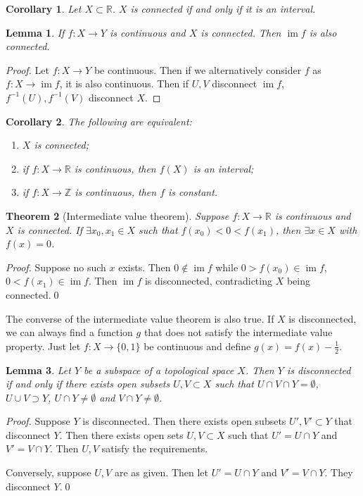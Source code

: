 \documentclass{article}
\theoremstyle{plain}\theoremheaderfont{\normalfont\itshape}\theorembodyfont{\rmfamily}\theoremseparator{.}\newtheorem*{rem}{Remark}\newtheorem*{ex}{Example}\newtheorem*{proof}{Proof}\newtheorem*{altp}{Alternative proof}
\theoremstyle{plain}\theoremheaderfont{\normalfont\bfseries}\theorembodyfont{\rmfamily}\theoremseparator{.}\newtheorem{thm}{Theorem}[section]\newtheorem{lem}[thm]{Lemma}\newtheorem{prop}[thm]{Proposition}\newtheorem*{cor}{Corollary}\newtheorem{defn}[thm]{Definition}\newtheorem{clm}[thm]{Claim}\newtheorem{clminproof}{Claim}
\theoremstyle{break}\theoremheaderfont{\normalfont\itshape}\theorembodyfont{\rmfamily}\theoremseparator{.\medskip}\newtheorem*{proofskip}{Proof}\newtheorem*{exs}{Examples}\newtheorem*{rems}{Remarks}
\theoremstyle{break}\theoremheaderfont{\normalfont\bfseries}\theorembodyfont{\rmfamily}\theoremseparator{.\medskip}\newtheorem{lemskip}[thm]{Lemma}\newtheorem{defnskip}[thm]{Definition}\newtheorem{propskip}[thm]{Proposition}\newtheorem{thmskip}[thm]{Theorem}
\newcommand{\qed}{\hfill\ensuremath{\Box}}
\DeclareMathOperator{\im}{im}
\begin{document}
    \begin{cor}
        Let \(X\subset\mathbb{R}\). \(X\) is connected if and only if it is an interval.
    \end{cor}

    \begin{lem}
        If \(f:X\to Y\) is continuous and \(X\) is connected. Then \(\im f\) is also connected.
    \end{lem}
    \begin{proof}
        Let \(f:X\to Y\) be continuous. Then if we alternatively consider \(f\) as \(f:X\to \im f\), it is also continuous. Then if \(U,V\) disconnect \(\im f\), \(f^{-1}(U),f^{-1}(V)\) disconnect \(X\). 
    \end{proof}

    \begin{cor}
        The following are equivalent:
        \begin{enumerate}[label=(\roman*),topsep=0pt]
            \item \(X\) is connected;
            \item if \(f:X\to\mathbb{R}\) is continuous, then \(f(X)\) is an interval;
            \item if \(f:X\to\mathbb{Z}\) is continuous, then \(f\) is constant.
        \end{enumerate}
    \end{cor}

    \begin{thm}[Intermediate value theorem]
        Suppose \(f:X\to\mathbb{R}\) is continuous and \(X\) is connected. If \(\exists x_0,x_1\in X\) such that \(f(x_0)<0<f(x_1)\), then \(\exists x\in X\) with \(f(x)=0\).
    \end{thm}
    \begin{proof}
        Suppose no such \(x\) exists. Then \(0\not\in\im f\) while \(0>f(x_0)\in\im f\), \(0<f(x_1)\in\im f\). Then \(\im f\) is disconnected, contradicting \(X\) being connected.\qed
    \end{proof}

    The converse of the intermediate value theorem is also true. If \(X\) is disconnected, we can always find a function \(g\) that does not satisfy the intermediate value property. Just let \(f:X\to\{0,1\}\) be continuous and define \(g(x)=f(x)-\frac{1}{2}\).

    \begin{lem}
        Let \(Y\) be a subspace of a topological space \(X\). Then \(Y\) is disconnected if and only if there exists open subsets \(U,V\subset X\) such that \(U\cap V\cap Y=\emptyset\), \(U\cup V\supset Y\), \(U\cap Y\ne\emptyset\) and \(V\cap Y\ne\emptyset\).
    \end{lem}
    \begin{proof}
        Suppose \(Y\) is disconnected. Then there exists open subsets \(U',V'\subset Y\) that disconnect \(Y\). Then there exists open sets \(U,V\subset X\) such that \(U'=U\cap Y\) and \(V'=V\cap Y\). Then \(U,V\) satisfy the requirements.
        
        Conversely, suppose \(U,V\) are as given. Then let \(U'=U\cap Y\) and \(V'=V\cap Y\). They disconnect \(Y\).\qed
    \end{proof}
\end{document}
